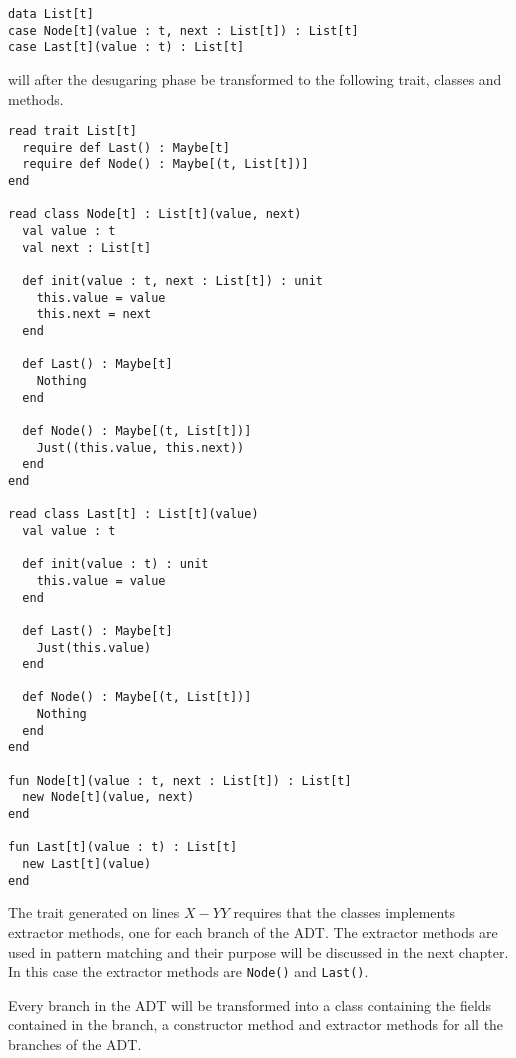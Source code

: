 \documentclass[10pt]{report}
\begin{document}
\begin{lstlisting}[language=encore,caption={Linked list before it has been desugared}]
data List[t]
case Node[t](value : t, next : List[t]) : List[t]
case Last[t](value : t) : List[t]
\end{lstlisting}

\par{\noindent will after the desugaring phase be transformed to the following trait, classes and methods.}

\begin{lstlisting}[language=encore,caption={Desugared linked list}]
read trait List[t]
  require def Last() : Maybe[t]
  require def Node() : Maybe[(t, List[t])]
end

read class Node[t] : List[t](value, next)
  val value : t
  val next : List[t]

  def init(value : t, next : List[t]) : unit
    this.value = value
    this.next = next
  end

  def Last() : Maybe[t]
    Nothing
  end

  def Node() : Maybe[(t, List[t])]
    Just((this.value, this.next))
  end
end

read class Last[t] : List[t](value)
  val value : t

  def init(value : t) : unit
    this.value = value
  end

  def Last() : Maybe[t]
    Just(this.value)
  end

  def Node() : Maybe[(t, List[t])]
    Nothing
  end
end

fun Node[t](value : t, next : List[t]) : List[t]
  new Node[t](value, next)
end

fun Last[t](value : t) : List[t]
  new Last[t](value)
end

\end{lstlisting}

\par{\noindent The trait generated on lines $X-YY$ requires that the classes implements extractor methods, one for each branch of the ADT\@. The extractor methods are used in pattern matching and their purpose will be discussed in the next chapter. In this case the extractor methods are \texttt{Node()} and \texttt{Last()}.\\}

\par{\noindent Every branch in the ADT will be transformed into a class containing the fields contained in the branch, a constructor method and extractor methods for all the branches of the ADT.\\}
\end{document}
